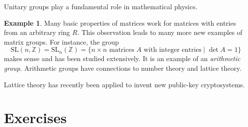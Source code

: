 \documentclass[11pt]{article}
\theoremstyle{definition}
\newtheorem{example}[thm]{Example}
\newcommand{\Z}{\mathbb{Z}} %
\newcommand{\SL}{\mathrm{SL}}
\begin{document}
Unitary groups play a fundamental role in mathematical physics. 


\begin{example}
Many basic properties of matrices work for matrices with entries from
an arbitrary ring $R$. This observation leads to many more new
examples of matrix groups.  For instance, the group
\[
  \SL(n,\Z) = \SL_n(\Z) = \{n \times n \text{ matrices $A$ with integer
    entries} \mid \det A = 1 \}
\]
makes sense and has been studied extensively. It is an example of an
\emph{arithmetic group}. Arithmetic groups
have connections to number theory and lattice theory.
\end{example}

Lattice theory has recently been applied to invent new public-key
cryptosystems.



\section*{Exercises}\noindent
\end{document}

